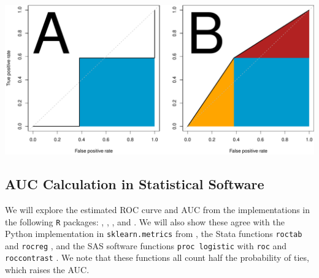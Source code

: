 \documentclass[article]{jss}
\let\origfigure\figure
\let\endorigfigure\endfigure
\renewenvironment{figure}[1][2] {
    \expandafter\origfigure\expandafter[H]
} {
    \endorigfigure
}
\begin{document}
\begin{CodeChunk}
\begin{figure}[h]

{\centering \includegraphics{index_files/figure-latex/main-1} 

}

\caption[ROC curve of the data in the simple concrete example]{ROC curve of the data in the simple concrete example.  Here we present a standard ROC curve, with the false positive rate or $1 - \text{specificity}$ on the x-axis and true positive rate or sensitivity on the y-axis.  The dotted line represents the identity. The shaded area in panel represents the AUC for the strict definition.  The additional shaded areas on panel B represent the AUC when accounting for ties.  }\label{fig:main}
\end{figure}
\end{CodeChunk}

\hypertarget{auc-calculation-in-statistical-software}{%
\subsection{AUC Calculation in Statistical
Software}\label{auc-calculation-in-statistical-software}}

We will explore the estimated ROC curve and AUC from the implementations
in the following \texttt{R} packages:  \citep{ROCR},
 \citep{caTools},  \citep{pROC}, and 
\citep{fbroc}. We will also show these agree with the Python
implementation in \texttt{sklearn.metrics} from 
\citep{scikitlearn}, the Stata functions \texttt{roctab} and
\texttt{rocreg} \citep{bamber1975area, delong}, and the SAS software
functions \texttt{proc\ logistic} with \texttt{roc} and
\texttt{roccontrast} . We note that these functions all count half the
probability of ties, which raises the AUC.
\end{document}
